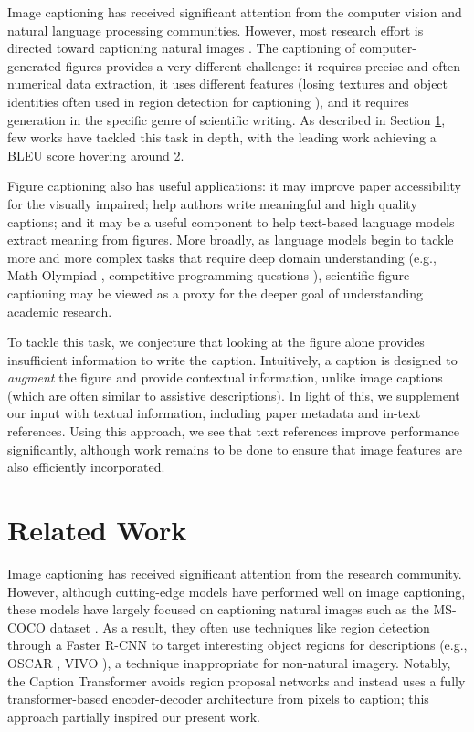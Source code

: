 \documentclass{article}
\begin{document}
Image captioning has received significant attention from the computer vision and natural language processing communities. However, most research effort is directed toward captioning natural images \citep{DBLP:journals/corr/abs-2107-13114}. The captioning of computer-generated figures provides a very different challenge: it requires precise and often numerical data extraction, it uses different features (losing textures and object identities often used in region detection for captioning \citep{DBLP:journals/corr/abs-2107-13114}), and it requires generation in the specific genre of scientific writing. As described in Section \ref{sec:related}, few works have tackled this task in depth, with the leading work \citep{scicap} achieving a BLEU score hovering around 2.

Figure captioning also has useful applications: it may improve paper accessibility for the visually impaired; help authors write meaningful and high quality captions; and it may be a useful component to help text-based language models extract meaning from figures. More broadly, as language models begin to tackle more and more complex tasks that require deep domain understanding (e.g., Math Olympiad \citep{DBLP:journals/corr/abs-2202-01344}, competitive programming questions \citep{alphacode, hendrycksapps2021}), scientific figure captioning may be viewed as a proxy for the deeper goal of understanding academic research.

To tackle this task, we conjecture that looking at the figure alone provides insufficient information to write the caption. Intuitively, a caption is designed to \emph{augment} the figure and provide contextual information, unlike image captions (which are often similar to assistive descriptions). In light of this, we supplement our input with textual information, including paper metadata and in-text references. Using this approach, we see that text references improve performance significantly, although work remains to be done to ensure that image features are also efficiently incorporated.

\section{Related Work}
\label{sec:related}
Image captioning has received significant attention from the research community. However, although cutting-edge models have performed well on image captioning, these models have largely focused on captioning natural images such as the MS-COCO dataset \citep{DBLP:journals/corr/ChenFLVGDZ15}. As a result, they often use techniques like region detection through a Faster R-CNN \citep{7485869} to target interesting object regions for descriptions (e.g., OSCAR \citep{li2020oscar}, VIVO \citep{DBLP:journals/corr/abs-2009-13682}), a technique inappropriate for non-natural imagery. Notably, the Caption Transformer \citep{DBLP:journals/corr/abs-2101-10804} avoids region proposal networks and instead uses a fully transformer-based encoder-decoder architecture from pixels to caption; this approach partially inspired our present work.
\end{document}
